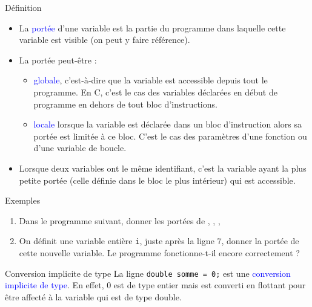 \documentclass[10pt]{beamer}
\begin{document}
\begin{frame}{\Ctitle}{\stitle}
	\begin{alertblock}{Définition}
		\begin{itemize}
			\item<1-> La \textcolor{blue}{portée} d'une variable est la partie du programme  dans laquelle cette variable est visible (on peut y faire référence).
			\item<2-> La portée peut-être :
				\begin{itemize}
					\item<3-> \textcolor{blue}{globale}, c'est-à-dire que la variable est accessible depuis tout le programme. En C, c'est le cas des variables déclarées en début de programme en dehors de tout bloc d'instructions.
					\item<4-> \textcolor{blue}{locale} lorsque la variable est déclarée dans un bloc d'instruction alors sa portée est limitée à ce bloc. C'est le cas des paramètres d'une fonction ou d'une variable de boucle.
				\end{itemize}
			\item<5-> Lorsque deux variables ont le même identifiant, c'est la variable ayant la plus petite portée (celle définie dans le bloc le plus intérieur) qui est accessible.
		\end{itemize}
	\end{alertblock}
\end{frame}

\begin{frame}[fragile]{\Ctitle}{\stitle}
	\begin{exampleblock}{Exemples}
		\begin{enumerate}
		\item<1->{\small Dans le programme suivant, donner les portées de , , , }
		\item<2->{\small On définit une variable entière {\tt i}, juste après la ligne 7, donner la portée de cette nouvelle variable. Le programme fonctionne-t-il encore correctement ?}
		\end{enumerate}
	\end{exampleblock}
\end{frame}


\begin{frame}[fragile]{\Ctitle}{\stitle}

	\begin{block}{Conversion implicite de type}
		La ligne \texttt{double somme = 0;} est une \textcolor{blue}{conversion implicite de type}. En effet, 0 est de type entier mais est converti en flottant pour être affecté à la variable  qui est de type double.
	\end{block}
\end{frame}
\end{document}
